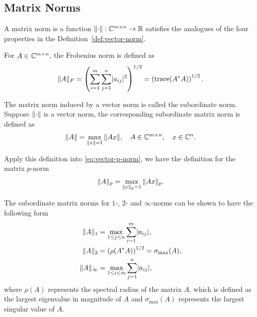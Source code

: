 \documentclass[12pt]{article}
\begin{document}
\subsection{Matrix Norms} \label{subsec:matrix-norms}
\begin{definition}
    A matrix norm is a function $\|{\cdot}\|:\mathbb{C}^{m\times n} \to \mathbb{R}$ satisfies the analogues of the four properties in the Definition~\ref{def:vector-norm}.
\end{definition}

\begin{example}
    For $A\in\mathbb{C}^{m\times n}$, the Frobenius norm is defined as
    \begin{equation}
        \notag
        \|{A}\|_F = \left(\sum_{i = 1}^m \sum_{j = 1}^n \lvert a_{ij}\rvert^2\right)^{1/2} = \left(\mathrm{trace}(A^* A)\right)^{1/2}.
    \end{equation}
\end{example}

\begin{example}
    The matrix norm induced by a vector norm is called the subordinate norm. Suppose $\|{\cdot}\|$ is a vector norm, the corresponding subordinate matrix norm is defined as 
    \begin{equation}
        \notag 
        \|{A}\| = \max_{\|{x}\| = 1} \|{Ax}\|, \quad A \in \mathbb{C}^{m\times n}, \quad x \in \mathbb{C}^n.
    \end{equation}

    Apply this definition into \eqref{eq:vector-p-norm}, we have the definition for the matrix $p$-norm 
    \begin{equation}
        \notag 
        \|{A}\|_p = \max_{\|{x}\|_p = 1} \|{Ax}\|_{p}.
    \end{equation}

    The subordinate matrix norms for $1$-, $2$- and $\infty$-norms can be shown to have the following form 
    \begin{equation}
        \notag 
        \begin{aligned}
            \|{A}\|_1 &= \max_{1\leq j \leq n} \sum_{i = 1}^m \lvert a_{ij}\rvert, \\
            \|{A}\|_2 &= \left(\rho(A^* A)\right)^{1/2} = \sigma_{\max}(A),\\
            \|{A}\|_\infty & = \max_{1 \leq i \leq m} \sum_{j = 1}^n \lvert a_{ij}\rvert,
        \end{aligned}
    \end{equation}
    where $\rho(A)$ represents the spectral radius of the matrix $A$, which is defined as the largest eigenvalue in magnitude of $A$ and $\sigma_{\max}(A)$ represents the largest singular value of $A$.
\end{example}
\end{document}
